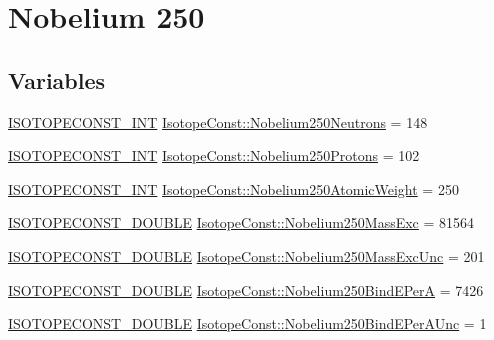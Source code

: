 \hypertarget{group___isotope_const-_nobelium-_no250}{}\section{Nobelium 250}
\label{group___isotope_const-_nobelium-_no250}
\subsection*{Variables}
\begin{DoxyCompactItemize}
\item 
\mbox{\hyperlink{group___isotope_const-_macros_ga5f18360b3e99483a35c32d789e62621c}{I\+S\+O\+T\+O\+P\+E\+C\+O\+N\+S\+T\+\_\+\+I\+NT}} \mbox{\hyperlink{group___isotope_const-_nobelium-_no250_gab3899b7abe0016d272fd61646579796a}{Isotope\+Const\+::\+Nobelium250\+Neutrons}} = 148
\item 
\mbox{\hyperlink{group___isotope_const-_macros_ga5f18360b3e99483a35c32d789e62621c}{I\+S\+O\+T\+O\+P\+E\+C\+O\+N\+S\+T\+\_\+\+I\+NT}} \mbox{\hyperlink{group___isotope_const-_nobelium-_no250_ga7bb8971a01f2ac90044945fcab8a0929}{Isotope\+Const\+::\+Nobelium250\+Protons}} = 102
\item 
\mbox{\hyperlink{group___isotope_const-_macros_ga5f18360b3e99483a35c32d789e62621c}{I\+S\+O\+T\+O\+P\+E\+C\+O\+N\+S\+T\+\_\+\+I\+NT}} \mbox{\hyperlink{group___isotope_const-_nobelium-_no250_ga2cb6511f256c1b61fb2fbdb12ac473c5}{Isotope\+Const\+::\+Nobelium250\+Atomic\+Weight}} = 250
\item 
\mbox{\hyperlink{group___isotope_const-_macros_ga8f45a7272ce02c0b4c65c44636ed719a}{I\+S\+O\+T\+O\+P\+E\+C\+O\+N\+S\+T\+\_\+\+D\+O\+U\+B\+LE}} \mbox{\hyperlink{group___isotope_const-_nobelium-_no250_gaad2ca777063a9a36ad088ce19f85f598}{Isotope\+Const\+::\+Nobelium250\+Mass\+Exc}} = 81564
\item 
\mbox{\hyperlink{group___isotope_const-_macros_ga8f45a7272ce02c0b4c65c44636ed719a}{I\+S\+O\+T\+O\+P\+E\+C\+O\+N\+S\+T\+\_\+\+D\+O\+U\+B\+LE}} \mbox{\hyperlink{group___isotope_const-_nobelium-_no250_ga0f53e650a8a9f723e51bc957904d1b95}{Isotope\+Const\+::\+Nobelium250\+Mass\+Exc\+Unc}} = 201
\item 
\mbox{\hyperlink{group___isotope_const-_macros_ga8f45a7272ce02c0b4c65c44636ed719a}{I\+S\+O\+T\+O\+P\+E\+C\+O\+N\+S\+T\+\_\+\+D\+O\+U\+B\+LE}} \mbox{\hyperlink{group___isotope_const-_nobelium-_no250_gaa93d5bc35cdab0be717eece67b27936d}{Isotope\+Const\+::\+Nobelium250\+Bind\+E\+PerA}} = 7426
\item 
\mbox{\hyperlink{group___isotope_const-_macros_ga8f45a7272ce02c0b4c65c44636ed719a}{I\+S\+O\+T\+O\+P\+E\+C\+O\+N\+S\+T\+\_\+\+D\+O\+U\+B\+LE}} \mbox{\hyperlink{group___isotope_const-_nobelium-_no250_ga4a71bb85349cd9c451ec697878708468}{Isotope\+Const\+::\+Nobelium250\+Bind\+E\+Per\+A\+Unc}} = 1

\end{DoxyCompactItemize}
